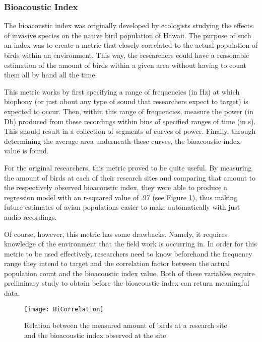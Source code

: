 \subsubsection{Bioacoustic Index}
The bioacoustic index was originally developed by ecologists studying the effects of invasive species on the native bird population of Hawaii. The purpose of such an index was to create a metric that closely correlated to the actual population of birds within an environment. This way, the researchers could have a reasonable estimation of the amount of birds within a given area without having to count them all by hand all the time.\par
This metric works by first specifying a range of frequencies (in Hz) at which biophony (or just about any type of sound that researchers expect to target) is expected to occur. Then, within this range of frequencies, measure the power (in Db) produced from these recordings within bins of specified ranges of time (in s). This should result in a collection of segments of curves of power. Finally, through determining the average area underneath these curves, the bioacoustic index value is found.\par
For the original researchers, this metric proved to be quite useful. By measuring the amount of birds at each of their research sites and comparing that amount to the respectively observed bioacoustic index, they were able to produce a regression model with an r-squared value of .97 (see Figure \ref{fig:BiCorrelation}), thus making future estimates of avian populations easier to make automatically with just audio recordings.\cite{boelman}\par
Of course, however, this metric has some drawbacks. Namely, it requires knowledge of the environment that the field work is occurring in. In order for this metric to be used effectively, researchers need to know beforehand the frequency range they intend to target and the correlation factor between the actual population count and the bioacoustic index value. Both of these variables require preliminary study to obtain before the bioacoustic index can return meaningful data.\par
\begin{figure}
  \begin{center}
    \texttt{[image: BiCorrelation]}
  \end{center}
  \caption{Relation between the measured amount of birds at a research site and the bioacoustic index observed at the site}
  \label{fig:BiCorrelation}
\end{figure}
